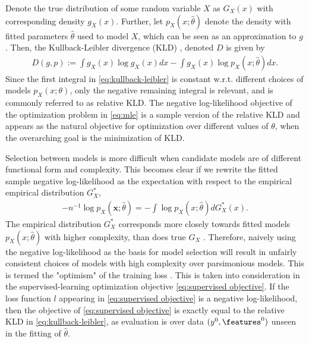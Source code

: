 Denote the true distribution of some random variable $X$ as $G_X(x)$ with corresponding density $g_X(x)$. Further, let $p_X(x;\hat{\theta})$ denote the density with fitted parameters $\hat{\theta}$ used to model $X$, which can be seen as an approximation to $g$.
Then, the Kullback-Leibler divergence (KLD) \citep{kullback1951information}, denoted $D$ is given by 
\begin{align}\label{eq:kullback-leibler}
	D(g,p)
	:= \int g_X(x)\log g_X(x) dx - \int g_X(x)\log p_X(x;\hat{\theta}) dx.
\end{align}
Since the first integral in \eqref{eq:kullback-leibler} is constant w.r.t. different choices of models $p_X(x;\theta)$, only the negative remaining integral is relevant, and is commonly referred to as relative KLD.
The negative log-likelihood objective of the optimization problem in \eqref{eq:mle} is a sample version of the relative KLD and appears as the natural objective for optimization over different values of $\theta$, when the overarching goal is the minimization of KLD.

Selection between models is more difficult when candidate models are of different functional form and complexity.
This becomes clear if we rewrite the fitted sample negative log-likelihood as the expectation with respect to the empirical empirical distribution $G_X^*$,
\begin{align}\label{eq:loss-wrt-empirical-distribution}
	-n^{-1}\log p_X(\mathbf{x};\hat\theta) = -\int \log p_X(x;\hat{\theta}) dG_X^*(x).
\end{align}
The empirical distribution $G_X^*$ corresponds more closely towards fitted models $p_X(x;\hat\theta)$ with higher complexity, than does true $G_X$ \citep{konishi1996generalised}.
Therefore, naively using the negative log-likelihood as the basis for model selection will result in unfairly consistent choices of models with high complexity over parsimonious models.
This is termed the "optimism" of the training loss \citep{friedman2001elements}.
This is taken into consideration in the supervised-learning optimization objective \eqref{eq:supervised objective}.
If the loss function $l$ appearing in \eqref{eq:supervised objective} is a negative log-likelihood, then the objective of \eqref{eq:supervised objective} is exactly equal to the relative KLD in \eqref{eq:kullback-leibler}, as evaluation is over data $(y^0,\features^0)$ unseen in the fitting of $\hat\theta$.



